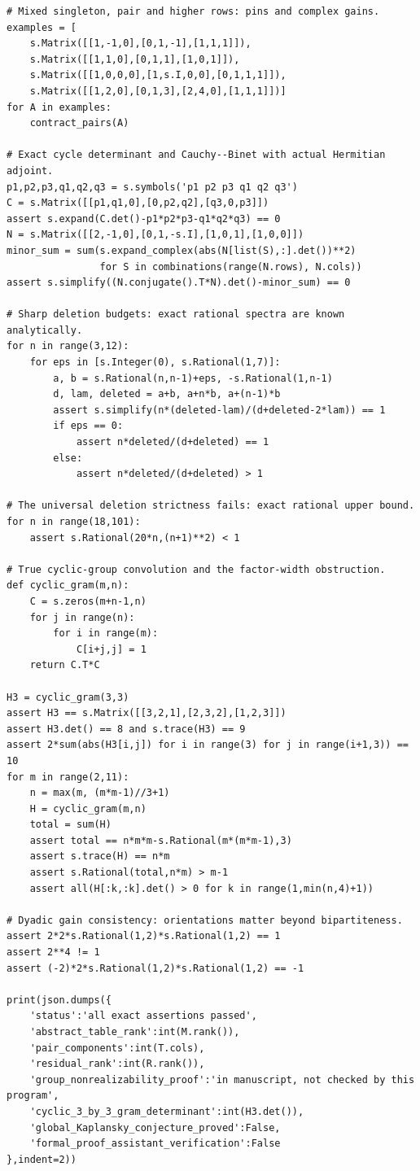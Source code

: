 \documentclass[11pt,a4paper,oneside]{report}
\theoremstyle{definition}
\theoremstyle{remark}
\begin{document}
\begin{lstlisting}
# Mixed singleton, pair and higher rows: pins and complex gains.
examples = [
    s.Matrix([[1,-1,0],[0,1,-1],[1,1,1]]),
    s.Matrix([[1,1,0],[0,1,1],[1,0,1]]),
    s.Matrix([[1,0,0,0],[1,s.I,0,0],[0,1,1,1]]),
    s.Matrix([[1,2,0],[0,1,3],[2,4,0],[1,1,1]])]
for A in examples:
    contract_pairs(A)

# Exact cycle determinant and Cauchy--Binet with actual Hermitian adjoint.
p1,p2,p3,q1,q2,q3 = s.symbols('p1 p2 p3 q1 q2 q3')
C = s.Matrix([[p1,q1,0],[0,p2,q2],[q3,0,p3]])
assert s.expand(C.det()-p1*p2*p3-q1*q2*q3) == 0
N = s.Matrix([[2,-1,0],[0,1,-s.I],[1,0,1],[1,0,0]])
minor_sum = sum(s.expand_complex(abs(N[list(S),:].det())**2)
                for S in combinations(range(N.rows), N.cols))
assert s.simplify((N.conjugate().T*N).det()-minor_sum) == 0

# Sharp deletion budgets: exact rational spectra are known analytically.
for n in range(3,12):
    for eps in [s.Integer(0), s.Rational(1,7)]:
        a, b = s.Rational(n,n-1)+eps, -s.Rational(1,n-1)
        d, lam, deleted = a+b, a+n*b, a+(n-1)*b
        assert s.simplify(n*(deleted-lam)/(d+deleted-2*lam)) == 1
        if eps == 0:
            assert n*deleted/(d+deleted) == 1
        else:
            assert n*deleted/(d+deleted) > 1

# The universal deletion strictness fails: exact rational upper bound.
for n in range(18,101):
    assert s.Rational(20*n,(n+1)**2) < 1

# True cyclic-group convolution and the factor-width obstruction.
def cyclic_gram(m,n):
    C = s.zeros(m+n-1,n)
    for j in range(n):
        for i in range(m):
            C[i+j,j] = 1
    return C.T*C

H3 = cyclic_gram(3,3)
assert H3 == s.Matrix([[3,2,1],[2,3,2],[1,2,3]])
assert H3.det() == 8 and s.trace(H3) == 9
assert 2*sum(abs(H3[i,j]) for i in range(3) for j in range(i+1,3)) == 10
for m in range(2,11):
    n = max(m, (m*m-1)//3+1)
    H = cyclic_gram(m,n)
    total = sum(H)
    assert total == n*m*m-s.Rational(m*(m*m-1),3)
    assert s.trace(H) == n*m
    assert s.Rational(total,n*m) > m-1
    assert all(H[:k,:k].det() > 0 for k in range(1,min(n,4)+1))

# Dyadic gain consistency: orientations matter beyond bipartiteness.
assert 2*2*s.Rational(1,2)*s.Rational(1,2) == 1
assert 2**4 != 1
assert (-2)*2*s.Rational(1,2)*s.Rational(1,2) == -1

print(json.dumps({
    'status':'all exact assertions passed',
    'abstract_table_rank':int(M.rank()),
    'pair_components':int(T.cols),
    'residual_rank':int(R.rank()),
    'group_nonrealizability_proof':'in manuscript, not checked by this program',
    'cyclic_3_by_3_gram_determinant':int(H3.det()),
    'global_Kaplansky_conjecture_proved':False,
    'formal_proof_assistant_verification':False
},indent=2))
\end{lstlisting}
\end{document}
